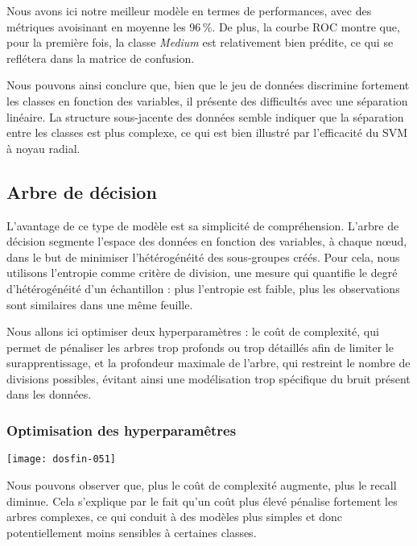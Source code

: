 \documentclass[a4paper,11pt]{article}
\begin{document}
Nous avons ici notre meilleur modèle en termes de performances, avec des métriques avoisinant en moyenne les 96\,\%.  
De plus, la courbe ROC montre que, pour la première fois, la classe \textit{Medium} est relativement bien prédite, ce qui se reflétera dans la matrice de confusion.

Nous pouvons ainsi conclure que, bien que le jeu de données discrimine fortement les classes en fonction des variables, il présente des difficultés avec une séparation linéaire.  
La structure sous-jacente des données semble indiquer que la séparation entre les classes est plus complexe, ce qui est bien illustré par l'efficacité du SVM à noyau radial.

\newpage

\subsection{Arbre de décision}

L’avantage de ce type de modèle est sa simplicité de compréhension.  
L’arbre de décision segmente l’espace des données en fonction des variables, à chaque nœud, dans le but de minimiser l’hétérogénéité des sous-groupes créés.  
Pour cela, nous utilisons l’entropie comme critère de division, une mesure qui quantifie le degré d’hétérogénéité d’un échantillon : plus l’entropie est faible, plus les observations sont similaires dans une même feuille.

Nous allons ici optimiser deux hyperparamètres :  
le coût de complexité, qui permet de pénaliser les arbres trop profonds ou trop détaillés afin de limiter le surapprentissage,  
et la profondeur maximale de l’arbre, qui restreint le nombre de divisions possibles, évitant ainsi une modélisation trop spécifique du bruit présent dans les données.



\subsubsection{Optimisation des hyperparamêtres}



\begin{center}

\texttt{[image: dosfin-051]}

\end{center}

Nous pouvons observer que, plus le coût de complexité augmente, plus le recall diminue.  
Cela s’explique par le fait qu’un coût plus élevé pénalise fortement les arbres complexes, ce qui conduit à des modèles plus simples et donc potentiellement moins sensibles à certaines classes.
\end{document}

